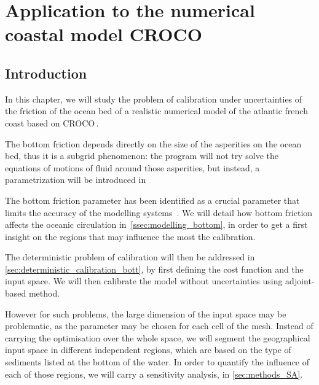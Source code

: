 \documentclass[../../Main_ManuscritThese.tex]{subfiles}
\newcommand{\CROCO}{CROCO\,}
\begin{document}
\chapter{Application to the numerical coastal model \CROCO}
\label{chap:croco}
\minitoc
\subfileLocal{\pagestyle{contentStyle}}

\section{Introduction}
\label{sec:intro_croco}


In this chapter, we will study the problem of calibration under
uncertainties of the friction of the ocean bed of a realistic
numerical model of the atlantic french coast based on \CROCO. 

The bottom friction depends directly on the size of the asperities on
the ocean bed, thus it is a subgrid phenomenon: the program will not
try solve the equations of motions of fluid around those asperities,
but instead, a parametrization will be introduced in

The bottom friction parameter has been identified as a crucial
parameter that limits the accuracy of the modelling
systems~\cite{boutet_estimation_2015,das_variational_1992,das_estimation_1991}.
We will detail how bottom friction affects the oceanic circulation
in~\cref{ssec:modelling_bottom}, in order to get a first insight on
the regions that may influence the most the calibration.

The deterministic problem of calibration will then be addressed in
\cref{sec:deterministic_calibration_bott}, by first defining the cost
function and the input space. We will then calibrate the model
without uncertainties using adjoint-based method.

However for such problems, the large dimension of the input space may
be problematic, as the parameter may be chosen for each cell of the
mesh. Instead of carrying the optimisation over the whole space, we
will segment the geographical input space in different independent
regions, which are based on the type of sediments listed at the bottom
of the water. In order to quantify the influence of each of those
regions, we will carry a sensitivity analysis, in \cref{sec:methods_SA}.
\end{document}
